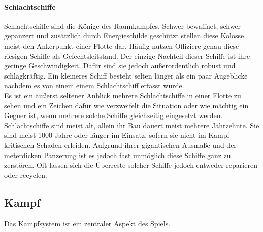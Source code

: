 \documentclass[11pt, a4paper]{article}
\begin{document}
\paragraph{Schlachtschiffe}
Schlachtschiffe sind die Könige des Raumkampfes. Schwer bewaffnet, schwer gepanzert und zusätzlich durch 
Energieschilde geschützt stellen diese Kolosse meist den Ankerpunkt einer Flotte dar. Häufig nutzen Offiziere
genau diese riesigen Schiffe als Gefechtsleitstand. Der einzige Nachteil dieser Schiffe ist ihre geringe
Geschwindigkeit. Dafür sind sie jedoch außerordentlich robust und schlagkräftig. Ein kleineres Schiff besteht 
selten länger als ein paar Augeblicke nachdem es von einem einem Schlachtschiff erfasst wurde.\\
Es ist ein äußerst seltener Anblick mehrere Schlachtschiffe in einer Flotte zu sehen und ein Zeichen dafür wie
verzweifelt die Situation oder wie mächtig ein Gegner ist, wenn mehrere solche Schiffe gleichzeitig eingesetzt
werden. Schlachtschiffe sind meist alt, allein ihr Bau dauert meist mehrere Jahrzehnte. Sie sind meist 1000
Jahre oder länger im Einsatz, sofern sie nicht im Kampf kritischen Schaden erleiden. Aufgrund ihrer 
gigantischen Ausmaße und der meterdicken Panzerung ist es jedoch fast unmöglich diese Schiffe ganz zu 
zerstören. Oft lassen sich die Überreste solcher Schiffe jedoch entweder reparieren oder recyclen.
%
\subsection{Kampf}
Das Kampfsystem ist ein zentraler Aspekt des Spiels. 
%
\end{document}
